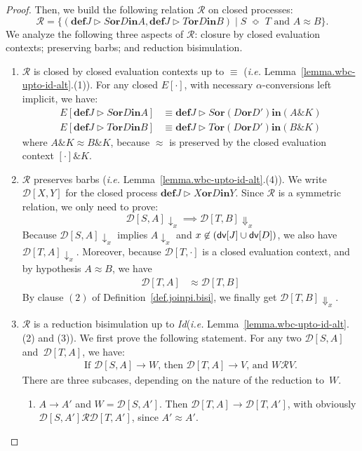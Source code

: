 \documentclass{LMCS}
\makeatletter
\newcommand{\ie}{\emph{i.e.}\@\xspace}
\newcommand{\Id}{\emph{Id}\@\xspace}
\newcommand{\kwd}[1]{\ensuremath{\mathbf{#1}}}
\newcommand{\prefix}[1]{\mathopen{}\mathrel{\kwd {#1}}}
\newcommand{\infix}[1]{\mathrel{\kwd {#1}}}
\newcommand{\set}[1]{\{#1\}}
\renewcommand{\_}{\mathord{\rule[-.25ex]{1ex}{.15ex}}}
\newcommand{\C}[1]{\llbracket#1\rrbracket}
\newcommand{\para}[2]{#1\mathop{\&}#2}
\newcommand{\dis}[2]{#1\infix{or}#2}
\newcommand{\define}[2]{\prefix{def} #1 \infix{in} #2}
\newcommand{\reaction}[2]{#1 \triangleright #2}
\newcommand{\reduces}{\longrightarrow}
\newcommand{\dd}{\mathcal{D}}
\newcommand{\wbc}{\mathrel{\approx}}
\newcommand{\R}{\mathrel{\mathcal{R}}}
\newcommand{\pseq}{\;\mathop{\Bumpeq}\;}
\newcommand{\weakbarb}[2]{#1\!\Downarrow_{#2}}
\newcommand{\barb}[2]{#1\!\downarrow_{#2}}
\newcommand{\econtext}[1]{E[#1]}
\newcommand{\dv}[1]{\mbox{\sf dv}[#1]}
\makeatother
\begin{document}
\begin{proof}
  Then, we build the following relation $\R$ on closed processes:
  $$
  \R = \set{(\define{\dis{\reaction{J}{S}}{D}}{A},
    \define{\dis{\reaction{J}{T}}{D}}{B}) \mid S\pseq T \mbox{ and } A \wbc
    B}.$$
  We analyze the following three aspects of $\R$: closure
  by closed evaluation contexts; preserving barbs; and reduction
  bisimulation.

  \begin{enumerate}[$\bullet$]
  \item $\R$ is closed by closed evaluation contexts up to $\equiv$
    (\ie Lemma~\ref{lemma.wbc-upto-id-alt}.(1)). For any closed
    $\econtext{\cdot}$, with necessary $\alpha$-conversions left
    implicit, we have:
    \begin{align*}
      \econtext{\define{\dis{\reaction{J}{S}}{D}}{A}} & \equiv
      \define{\dis{\reaction{J}{S}}{(\dis{D}{D'})}}{(\para{A}{K})}
      \\
      \econtext{\define{\dis{\reaction{J}{T}}{D}}{B}} & \equiv 
      \define{\dis{\reaction{J}{T}}{(\dis{D}{D'})}}{(\para{B}{K})}
    \end{align*}
    where $\para{A}{K} \wbc \para{B}{K}$, because $\wbc$ is preserved by
    the closed evaluation context $\para{[\cdot]}{K}$.
   
    \def\C#1{\dd[#1]}
  \item $\R$ preserves barbs (\ie
    Lemma~\ref{lemma.wbc-upto-id-alt}.(4)).  We write $\C{X, Y}$ for
    the closed process $\define{\dis{\reaction{J}{X}}{D}}{Y}$.  Since
    $\R$ is a symmetric relation, we only need to prove:
    $$\barb{\C{S,A}}{x} \implies \weakbarb{\C{T,B}}{x}$$
    Because $\barb{\C{S,A}}{x}$ implies $\barb{A}{x}$ and $x
    \not\in(\dv{J}\cup\dv{D})$, we also have $\barb{\C{T,A}}{x}$.
    Moreover, because $\C{T,\cdot}$ is a closed evaluation context,
    and by hypothesis $A \wbc B$, we have
    \begin{align}
      \C{T,A} &\wbc \C{T,B} \label{st.barb1}
    \end{align}
    By clause $(2)$ of Definition~\ref{def.joinpi.bisi}, we finally get
    $\weakbarb{\C{T,B}}{x}$.

  \item $\R$ is a reduction bisimulation up to \Id (\ie
    Lemma~\ref{lemma.wbc-upto-id-alt}.(2) and (3)).  We first prove
    the following statement.  For any two $\C{S,A}$ and~$\C{T,A}$, we
    have:
    \begin{align}
      \mbox{If $\C{S,A}\reduces W$, then $\C{T,A}\reduces V$, and
        $W\R V$.} \label{st.red2}
    \end{align}    
    There are three subcases, depending on the nature of the reduction
    to~$W$. 
\begin{enumerate}[(1)]
    \item $A\reduces A'$ and $W = \C{S,A'}$. Then
    $\C{T,A} \reduces \C{T,A'}$, with obviously $\C{S,A'} \R \C{T,A'}$,
    since $A'\wbc A'$.


\end{enumerate}
\end{enumerate}
\end{proof}
\end{document}
